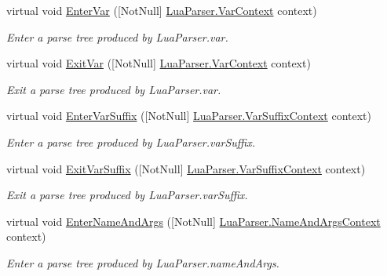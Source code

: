 \begin{DoxyCompactItemize}
virtual void \mbox{\hyperlink{classzlua_1_1_lua_base_listener_a45218c758db2cd6275fe4e000ae9a77e}{Enter\+Var}} (\mbox{[}Not\+Null\mbox{]} \mbox{\hyperlink{classzlua_1_1_lua_parser_1_1_var_context}{Lua\+Parser.\+Var\+Context}} context)
\begin{DoxyCompactList}\small\item\em Enter a parse tree produced by Lua\+Parser.\+var. \end{DoxyCompactList}\item 
virtual void \mbox{\hyperlink{classzlua_1_1_lua_base_listener_a37244bd0d8813ac29d8b841496ff4a75}{Exit\+Var}} (\mbox{[}Not\+Null\mbox{]} \mbox{\hyperlink{classzlua_1_1_lua_parser_1_1_var_context}{Lua\+Parser.\+Var\+Context}} context)
\begin{DoxyCompactList}\small\item\em Exit a parse tree produced by Lua\+Parser.\+var. \end{DoxyCompactList}\item 
virtual void \mbox{\hyperlink{classzlua_1_1_lua_base_listener_a743b7d8c5cc407d89b015a99597e711b}{Enter\+Var\+Suffix}} (\mbox{[}Not\+Null\mbox{]} \mbox{\hyperlink{classzlua_1_1_lua_parser_1_1_var_suffix_context}{Lua\+Parser.\+Var\+Suffix\+Context}} context)
\begin{DoxyCompactList}\small\item\em Enter a parse tree produced by Lua\+Parser.\+var\+Suffix. \end{DoxyCompactList}\item 
virtual void \mbox{\hyperlink{classzlua_1_1_lua_base_listener_af8716e19b6123340f1a13c0ecf019d06}{Exit\+Var\+Suffix}} (\mbox{[}Not\+Null\mbox{]} \mbox{\hyperlink{classzlua_1_1_lua_parser_1_1_var_suffix_context}{Lua\+Parser.\+Var\+Suffix\+Context}} context)
\begin{DoxyCompactList}\small\item\em Exit a parse tree produced by Lua\+Parser.\+var\+Suffix. \end{DoxyCompactList}\item 
virtual void \mbox{\hyperlink{classzlua_1_1_lua_base_listener_a118e7bc8edc07875df5c564171a36084}{Enter\+Name\+And\+Args}} (\mbox{[}Not\+Null\mbox{]} \mbox{\hyperlink{classzlua_1_1_lua_parser_1_1_name_and_args_context}{Lua\+Parser.\+Name\+And\+Args\+Context}} context)
\begin{DoxyCompactList}\small\item\em Enter a parse tree produced by Lua\+Parser.\+name\+And\+Args. \end{DoxyCompactList}\item 

\end{DoxyCompactItemize}
